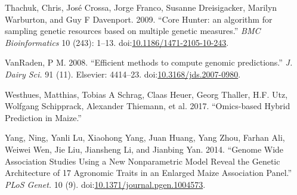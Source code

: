 \documentclass[]{elsarticle} %
\begin{document}
\hypertarget{ref-Thachuk2009}{}
Thachuk, Chris, José Crossa, Jorge Franco, Susanne Dreisigacker, Marilyn
Warburton, and Guy F Davenport. 2009. ``Core Hunter: an algorithm for
sampling genetic resources based on multiple genetic measures.''
\emph{BMC Bioinformatics} 10 (243): 1--13.
doi:\href{https://doi.org/10.1186/1471-2105-10-243}{10.1186/1471-2105-10-243}.

\hypertarget{ref-VanRaden2008}{}
VanRaden, P M. 2008. ``Efficient methods to compute genomic
predictions.'' \emph{J. Dairy Sci.} 91 (11). Elsevier: 4414--23.
doi:\href{https://doi.org/10.3168/jds.2007-0980}{10.3168/jds.2007-0980}.

\hypertarget{ref-Westhues2017}{}
Westhues, Matthias, Tobias A Schrag, Claas Heuer, Georg Thaller, H.F.
Utz, Wolfgang Schipprack, Alexander Thiemann, et al. 2017. ``Omics-based
Hybrid Prediction in Maize.''

\hypertarget{ref-Yang2014}{}
Yang, Ning, Yanli Lu, Xiaohong Yang, Juan Huang, Yang Zhou, Farhan Ali,
Weiwei Wen, Jie Liu, Jiansheng Li, and Jianbing Yan. 2014. ``Genome Wide
Association Studies Using a New Nonparametric Model Reveal the Genetic
Architecture of 17 Agronomic Traits in an Enlarged Maize Association
Panel.'' \emph{PLoS Genet.} 10 (9).
doi:\href{https://doi.org/10.1371/journal.pgen.1004573}{10.1371/journal.pgen.1004573}.
\end{document}
